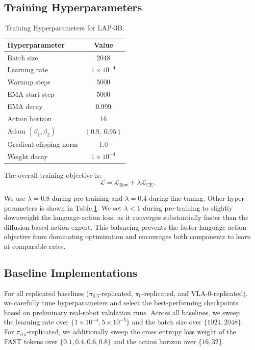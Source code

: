 \subsection{Training Hyperparameters} 
\begin{table}
    \centering
    \small
    \vspace{-1.2cm}
    \caption{Training Hyperparameters for LAP-3B.}
    \label{tab:hyperparams}
    \renewcommand{\arraystretch}{1.15}
    \begin{tabular}{l c}
    \toprule
    \textbf{Hyperparameter} & \textbf{Value} \\
    \midrule
    Batch size & 2048 \\
    Learning rate & $1 \times 10^{-4}$ \\
    Warmup steps & 5000 \\
    EMA start step & 5000 \\
    EMA decay & 0.999 \\
    Action horizon & 16 \\
    Adam $(\beta_1, \beta_2)$ & $(0.9,\ 0.95)$ \\
    Gradient clipping norm & 1.0 \\
    Weight decay & $1 \times 10^{-4}$ \\
    \bottomrule
    \end{tabular}
    \vspace{-8pt}
\end{table}
The overall training objective is:
\[
\mathcal{L} = \mathcal{L}_{\text{flow}} + \lambda \mathcal{L}_{\text{CE}}.
\]

We use $\lambda=0.8$ during pre-training and $\lambda=0.4$ during fine-tuning. Other hyper-parameters is shown in Table.\ref{tab:hyperparams}. We set $\lambda<1$ during pre-training to slightly downweight the language-action loss, as it converges substantially faster than the diffusion-based action expert. This balancing prevents the faster language-action objective from dominating optimization and encourages both components to learn at comparable rates.


\subsection{Baseline Implementations}
For all replicated baselines ($\pi_{0.5}$-replicated, $\pi_{0}$-replicated, and VLA-0-replicated), we carefully tune hyperparameters and select the best-performing checkpoints based on preliminary real-robot validation runs. 
Across all baselines, we sweep the learning rate over $\{1\times10^{-4}, 5\times10^{-5}\}$ and the batch size over $\{1024, 2048\}$. 
For $\pi_{0.5}$-replicated, we additionally sweep the cross entropy loss weight of the FAST tokens over $\{0.1, 0.4, 0.6, 0.8\}$ and the action horizon over $\{16, 32\}$.


